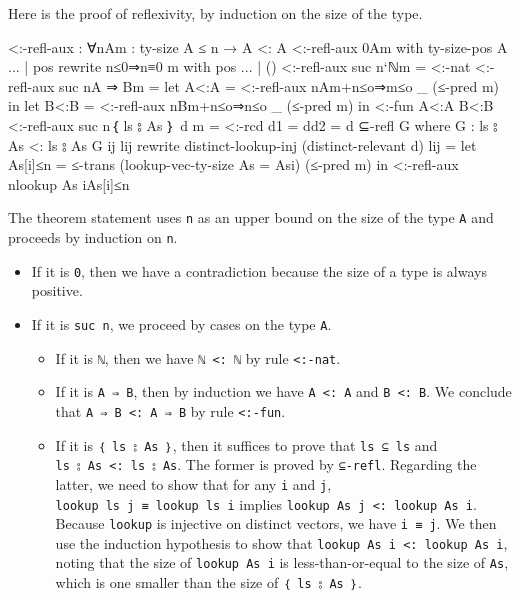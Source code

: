 Here is the proof of reflexivity, by induction on the size of the type.

\begin{fence}
\begin{code}
<:-refl-aux : ∀{n}{A}{m : ty-size A ≤ n} → A <: A
<:-refl-aux {0}{A}{m}
    with ty-size-pos {A}
... | pos rewrite n≤0⇒n≡0 m
    with pos
... | ()
<:-refl-aux {suc n}{`ℕ}{m} = <:-nat
<:-refl-aux {suc n}{A ⇒ B}{m} =
  let A<:A = <:-refl-aux {n}{A}{m+n≤o⇒m≤o _ (≤-pred m) } in
  let B<:B = <:-refl-aux {n}{B}{m+n≤o⇒n≤o _ (≤-pred m) } in
  <:-fun A<:A B<:B
<:-refl-aux {suc n}{｛ ls ⦂ As ｝ {d} }{m} = <:-rcd {d1 = d}{d2 = d} ⊆-refl G
    where
    G : ls ⦂ As <: ls ⦂ As
    G {i}{j} lij rewrite distinct-lookup-inj (distinct-relevant d) lij =
        let As[i]≤n = ≤-trans (lookup-vec-ty-size {As = As}{i}) (≤-pred m) in
        <:-refl-aux {n}{lookup As i}{As[i]≤n}
\end{code}
\end{fence}

The theorem statement uses \texttt{n} as an upper bound on the size of
the type \texttt{A} and proceeds by induction on \texttt{n}.

\begin{itemize}
\item
  If it is \texttt{0}, then we have a contradiction because the size of
  a type is always positive.
\item
  If it is \texttt{suc\ n}, we proceed by cases on the type \texttt{A}.

  \begin{itemize}
  \tightlist
  \item
    If it is \texttt{ℕ}, then we have \texttt{ℕ\ \textless{}:\ ℕ} by
    rule \texttt{\textless{}:-nat}.
  \item
    If it is \texttt{A\ ⇒\ B}, then by induction we have
    \texttt{A\ \textless{}:\ A} and \texttt{B\ \textless{}:\ B}. We
    conclude that \texttt{A\ ⇒\ B\ \textless{}:\ A\ ⇒\ B} by rule
    \texttt{\textless{}:-fun}.
  \item
    If it is \texttt{｛\ ls\ ⦂\ As\ ｝}, then it suffices to prove that
    \texttt{ls\ ⊆\ ls} and \texttt{ls\ ⦂\ As\ \textless{}:\ ls\ ⦂\ As}.
    The former is proved by \texttt{⊆-refl}. Regarding the latter, we
    need to show that for any \texttt{i} and \texttt{j},
    \texttt{lookup\ ls\ j\ ≡\ lookup\ ls\ i} implies
    \texttt{lookup\ As\ j\ \textless{}:\ lookup\ As\ i}. Because
    \texttt{lookup} is injective on distinct vectors, we have
    \texttt{i\ ≡\ j}. We then use the induction hypothesis to show that
    \texttt{lookup\ As\ i\ \textless{}:\ lookup\ As\ i}, noting that the
    size of \texttt{lookup\ As\ i} is less-than-or-equal to the size of
    \texttt{As}, which is one smaller than the size of
    \texttt{｛\ ls\ ⦂\ As\ ｝}.
  \end{itemize}
\end{itemize}

